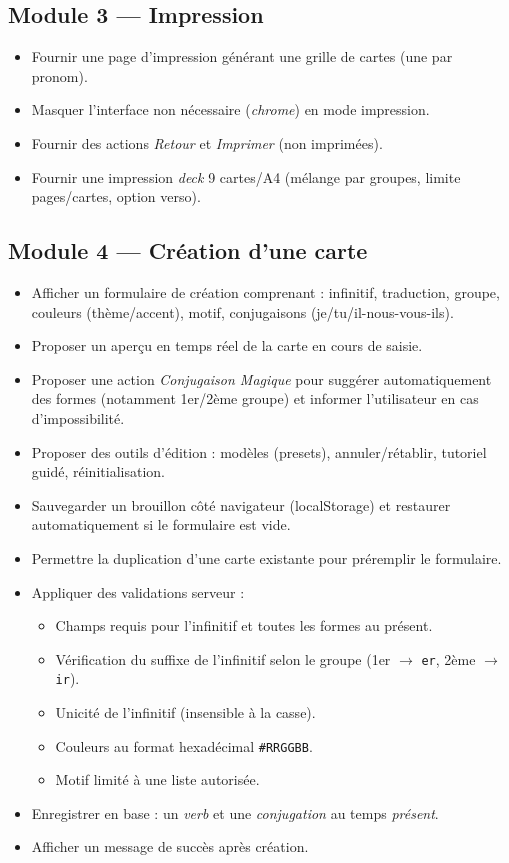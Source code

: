 \documentclass[12pt,a4paper]{article}
\begin{document}
\subsection{Module 3 --- Impression}
\begin{itemize}[leftmargin=*]
  \item Fournir une page d'impression générant une grille de cartes (une par pronom).
  \item Masquer l'interface non nécessaire (\emph{chrome}) en mode impression.
  \item Fournir des actions \emph{Retour} et \emph{Imprimer} (non imprimées).
  \item Fournir une impression \emph{deck} 9 cartes/A4 (mélange par groupes, limite pages/cartes, option verso).
\end{itemize}

\subsection{Module 4 --- Création d'une carte}
\begin{itemize}[leftmargin=*]
  \item Afficher un formulaire de création comprenant : infinitif, traduction, groupe, couleurs (thème/accent), motif, conjugaisons (je/tu/il-nous-vous-ils).
  \item Proposer un aperçu en temps réel de la carte en cours de saisie.
  \item Proposer une action \emph{Conjugaison Magique} pour suggérer automatiquement des formes (notamment 1er/2ème groupe) et informer l'utilisateur en cas d'impossibilité.
  \item Proposer des outils d'édition : modèles (presets), annuler/rétablir, tutoriel guidé, réinitialisation.
  \item Sauvegarder un brouillon côté navigateur (localStorage) et restaurer automatiquement si le formulaire est vide.
  \item Permettre la duplication d'une carte existante pour préremplir le formulaire.
  \item Appliquer des validations serveur :
    \begin{itemize}[leftmargin=*]
      \item Champs requis pour l'infinitif et toutes les formes au présent.
      \item Vérification du suffixe de l'infinitif selon le groupe (1er \(\rightarrow\) \texttt{er}, 2ème \(\rightarrow\) \texttt{ir}).
      \item Unicité de l'infinitif (insensible à la casse).
      \item Couleurs au format hexadécimal \texttt{\#RRGGBB}.
      \item Motif limité à une liste autorisée.
    \end{itemize}
  \item Enregistrer en base : un \emph{verb} et une \emph{conjugation} au temps \emph{présent}.
  \item Afficher un message de succès après création.
\end{itemize}
\end{document}
